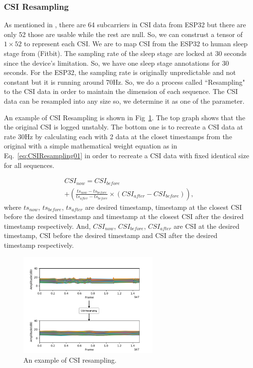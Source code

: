 \documentclass[10pt,letterpaper]{article}
\begin{document}
	\subsubsection*{CSI Resampling}
	
	As mentioned in , there are 64 subcarriers in CSI data from ESP32 but there are only 52 those are usable while the rest are null. So, we can construst a tensor of $1 \times 52$ to represent each CSI. We are to map CSI from the ESP32 to human sleep stage from {(Fitbit)}. The sampling rate of the sleep stage are locked at 30 seconds 
	 since the device's limitation. So, we have one sleep stage annotations for 30 seconds. For the ESP32, the sampling rate is originally unpredictable and not constant but it is running around 70Hz. So, we do a process called ``Resampling" to the CSI data in order to maintain the dimension of each sequence. The CSI data can be resampled into any size so, we determine it as one of the parameter.
	
	An example of CSI Resampling is shown in Fig~\ref{fig:CSIResampling01}. The top graph shows that the the original CSI is logged unstably. The bottom one is to recreate a CSI data at rate 30Hz by calculating each with 2 data at the closet timestamps from the original with a simple mathematical weight equation as in Eq.~\ref{eq:CSIResampling01} in order to recreate a CSI data with fixed identical size for all sequences.
	
	\begin{equation}
	\begin{aligned}
	& CSI_{now} = CSI_{before} \\ 
	& + \left(  \frac{ts_{now}-ts_{before}}{ts_{after}-ts_{before}}  \times (CSI_{after}-CSI_{before})   \right),
	\label{eq:CSIResampling01}
	\end{aligned}
	\end{equation}
	where $ts_{now}$, $ts_{before}$, $ts_{after}$ are desired timestamp, timestamp at the closest CSI before the desired timestamp and timestamp at the closest CSI after the desired timestamp respectively. And, $CSI_{now}$, $CSI_{before}$, $CSI_{after}$ are CSI at the desired timestamp, CSI before the desired timestamp and CSI after the desired timestamp respectively.
	
	\begin{figure}[htbp]
		\centerline{\includegraphics[width=70mm,scale=0.5]{CSIResampling03.png}}
		\caption{An example of CSI resampling.}
		\label{fig:CSIResampling01}
	\end{figure}
	
\end{document}
